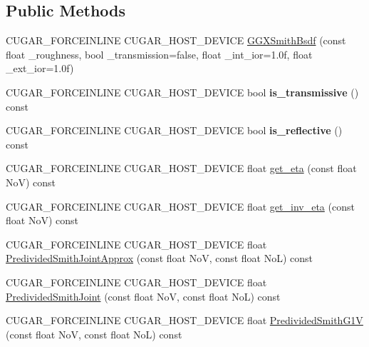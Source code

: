 \subsection*{Public Methods}
\begin{DoxyCompactItemize}
\item 
C\+U\+G\+A\+R\+\_\+\+F\+O\+R\+C\+E\+I\+N\+L\+I\+NE C\+U\+G\+A\+R\+\_\+\+H\+O\+S\+T\+\_\+\+D\+E\+V\+I\+CE \hyperlink{structcugar_1_1_g_g_x_smith_bsdf_ab90265f2877e5687b0ee232628223f9f}{G\+G\+X\+Smith\+Bsdf} (const float \+\_\+roughness, bool \+\_\+transmission=false, float \+\_\+int\+\_\+ior=1.\+0f, float \+\_\+ext\+\_\+ior=1.\+0f)
\item 
\mbox{\label{structcugar_1_1_g_g_x_smith_bsdf_ae93a20e70987f44023d015393d3862f1}} 
C\+U\+G\+A\+R\+\_\+\+F\+O\+R\+C\+E\+I\+N\+L\+I\+NE C\+U\+G\+A\+R\+\_\+\+H\+O\+S\+T\+\_\+\+D\+E\+V\+I\+CE bool {\bfseries is\+\_\+transmissive} () const
\item 
\mbox{\label{structcugar_1_1_g_g_x_smith_bsdf_a4fca95f7ddf299099f2fa1321766983b}} 
C\+U\+G\+A\+R\+\_\+\+F\+O\+R\+C\+E\+I\+N\+L\+I\+NE C\+U\+G\+A\+R\+\_\+\+H\+O\+S\+T\+\_\+\+D\+E\+V\+I\+CE bool {\bfseries is\+\_\+reflective} () const
\item 
C\+U\+G\+A\+R\+\_\+\+F\+O\+R\+C\+E\+I\+N\+L\+I\+NE C\+U\+G\+A\+R\+\_\+\+H\+O\+S\+T\+\_\+\+D\+E\+V\+I\+CE float \hyperlink{structcugar_1_1_g_g_x_smith_bsdf_acc12fa2b75dbdfb9f35c937a061cd069}{get\+\_\+eta} (const float NoV) const
\item 
C\+U\+G\+A\+R\+\_\+\+F\+O\+R\+C\+E\+I\+N\+L\+I\+NE C\+U\+G\+A\+R\+\_\+\+H\+O\+S\+T\+\_\+\+D\+E\+V\+I\+CE float \hyperlink{structcugar_1_1_g_g_x_smith_bsdf_a8f29961a23cd157215bff163a79e124f}{get\+\_\+inv\+\_\+eta} (const float NoV) const
\item 
C\+U\+G\+A\+R\+\_\+\+F\+O\+R\+C\+E\+I\+N\+L\+I\+NE C\+U\+G\+A\+R\+\_\+\+H\+O\+S\+T\+\_\+\+D\+E\+V\+I\+CE float \hyperlink{structcugar_1_1_g_g_x_smith_bsdf_a1c03635da555a5a547ed42f1b4f9c2ea}{Predivided\+Smith\+Joint\+Approx} (const float NoV, const float NoL) const
\item 
C\+U\+G\+A\+R\+\_\+\+F\+O\+R\+C\+E\+I\+N\+L\+I\+NE C\+U\+G\+A\+R\+\_\+\+H\+O\+S\+T\+\_\+\+D\+E\+V\+I\+CE float \hyperlink{structcugar_1_1_g_g_x_smith_bsdf_a8bd6a2ad63723c0de835f6c46dd8504d}{Predivided\+Smith\+Joint} (const float NoV, const float NoL) const
\item 
C\+U\+G\+A\+R\+\_\+\+F\+O\+R\+C\+E\+I\+N\+L\+I\+NE C\+U\+G\+A\+R\+\_\+\+H\+O\+S\+T\+\_\+\+D\+E\+V\+I\+CE float \hyperlink{structcugar_1_1_g_g_x_smith_bsdf_a752c827c820f94e92232e95b7a2773b1}{Predivided\+Smith\+G1V} (const float NoV, const float NoL) const

\end{DoxyCompactItemize}
